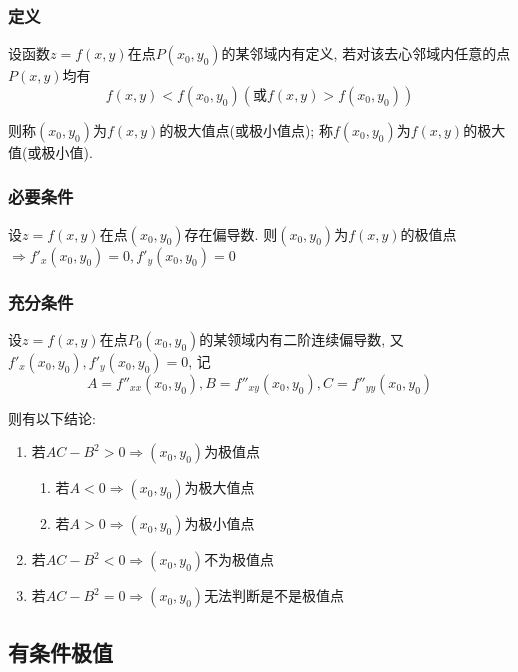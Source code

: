 \subsubsection{定义}
设函数$ z=f(x,y) $在点$ P(x_{0},y_{0}) $的某邻域内有定义, 若对该去心邻域内任意的点$ P(x,y) $均有
\begin{equation*}
f(x,y)<f(x_{0},y_{0})(\text{或}f(x,y)>f(x_{0},y_{0}))
\end{equation*}\par
则称$ (x_{0},y_{0}) $为$ f(x,y) $的极大值点(或极小值点); 称$ f(x_{0},y_{0}) $为$ f(x,y) $的极大值(或极小值).
\subsubsection{必要条件}
设$ z=f(x,y) $在点$ (x_{0},y_{0}) $存在偏导数. 则$ (x_{0},y_{0}) $为$ f(x,y) $的极值点$ \Rightarrow f'_{x}(x_{0},y_{0})=0, f'_{y}(x_{0},y_{0})=0 $
\subsubsection{充分条件}
设$ z=f(x,y) $在点$ P_{0}(x_{0},y_{0}) $的某领域内有二阶连续偏导数, 又$ f'_{x}(x_{0},y_{0}),f'_{y}(x_{0},y_{0})=0 $, 记
\begin{equation*}
A=f''_{xx}(x_{0},y_{0}), B=f''_{xy}(x_{0},y_{0}), C=f''_{yy}(x_{0},y_{0})
\end{equation*}\par
则有以下结论:
\begin{enumerate}
\item 若$ AC-B^{2}>0\Rightarrow (x_{0},y_{0}) $为极值点
\begin{enumerate}
\item 若$ A<0\Rightarrow (x_{0},y_{0}) $为极大值点
\item 若$ A>0\Rightarrow (x_{0},y_{0}) $为极小值点
\end{enumerate}
\item 若$ AC-B^{2}<0\Rightarrow (x_{0},y_{0}) $不为极值点
\item 若$ AC-B^{2}=0\Rightarrow (x_{0},y_{0}) $无法判断是不是极值点
\end{enumerate}
\subsection{有条件极值}
